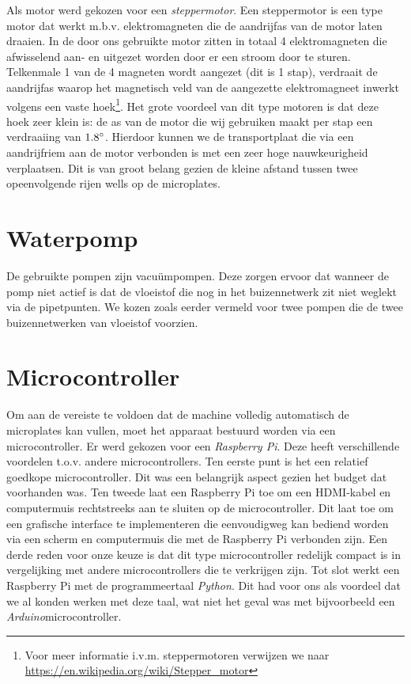 \documentclass[a4paper,twoside,kulak]{kulakreport} %
\begin{document}
Als motor werd gekozen voor een \textit{steppermotor}. Een steppermotor is een type motor dat werkt m.b.v. elektromagneten die de aandrijfas van de motor laten draaien. In de door ons gebruikte motor zitten in totaal 4 elektromagneten die afwisselend aan- en uitgezet worden door er een stroom door te sturen. Telkenmale 1 van de 4 magneten wordt aangezet (dit is 1 stap), verdraait de aandrijfas waarop het magnetisch veld van de aangezette elektromagneet inwerkt volgens een vaste hoek\footnote{Voor meer informatie i.v.m. steppermotoren verwijzen we naar \url{https://en.wikipedia.org/wiki/Stepper_motor}}. Het grote voordeel van dit type motoren is dat deze hoek zeer klein is: de as van de motor die wij gebruiken maakt per stap een verdraaiing van $1.8\degree$. Hierdoor kunnen we de transportplaat die via een aandrijfriem aan de motor verbonden is met een zeer hoge nauwkeurigheid verplaatsen. Dit is van groot belang gezien de kleine afstand tussen twee opeenvolgende rijen wells op de microplates. 

\section{Waterpomp}

De gebruikte pompen zijn vacuümpompen. Deze zorgen ervoor dat wanneer de pomp niet actief is dat de vloeistof die nog in het buizennetwerk zit niet weglekt via de pipetpunten. We kozen zoals eerder vermeld voor twee pompen die de twee buizennetwerken van vloeistof voorzien. 

\section{Microcontroller}

Om aan de vereiste te voldoen dat de machine volledig automatisch de microplates kan vullen, moet het apparaat bestuurd worden via een microcontroller. Er werd gekozen voor een \textit{Raspberry Pi}. Deze heeft verschillende voordelen t.o.v. andere microcontrollers. Ten eerste punt is het een relatief goedkope microcontroller. Dit was een belangrijk aspect gezien het budget dat voorhanden was. Ten tweede laat een Raspberry Pi toe om een HDMI-kabel en computermuis rechtstreeks aan te sluiten op de microcontroller. Dit laat toe om een grafische interface te implementeren die eenvoudigweg kan bediend worden via een scherm en computermuis die met de Raspberry Pi verbonden zijn. Een derde reden voor onze keuze is dat dit type microcontroller redelijk compact is in vergelijking met andere microcontrollers die te verkrijgen zijn. Tot slot werkt een Raspberry Pi met de programmeertaal \textit{Python}. Dit had voor ons als voordeel dat we al konden werken met deze taal, wat niet het geval was met bijvoorbeeld een \textit{Arduino}microcontroller. 
\end{document}
